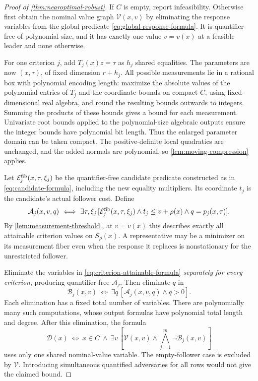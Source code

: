 \begin{proof}[Proof of \cref{thm:nearoptimal-robust}]
If $C$ is empty, report infeasibility. Otherwise first obtain the nominal value graph $\mathcal V(x,v)$ by eliminating
the response variables from the global predicate
\eqref{eq:global-response-formula}. It is quantifier-free of polynomial
size, and it has exactly one value $v=v(x)$ at a feasible leader and
none otherwise.

For one criterion $j$, add $T_j(x)z=\tau$ as $h_j$ shared equalities.
The parameters are now $(x,\tau)$, of fixed dimension $r+h_j$.
All possible measurements lie in a rational box with polynomial encoding
length: maximize the absolute values of the polynomial entries of
$T_j$ and the coordinate bounds on compact $C$, using fixed-dimensional
real algebra, and round the resulting bounds outwards to integers.
Summing the products of these bounds gives a bound for each measurement.
Univariate root bounds applied to the polynomial-size algebraic outputs
ensure the integer bounds have polynomial bit length. Thus the enlarged
parameter domain can be taken compact. The positive-definite local
quadratics are unchanged, and the added normals are polynomial, so
\cref{lem:moving-compression} applies.

Let $\mathcal E_j^{\rm fib}(x,\tau,\xi_j)$ be the quantifier-free
candidate predicate constructed as in \eqref{eq:candidate-formula},
including the new equality multipliers. Its coordinate $t_j$ is the
candidate's actual follower cost. Define
\begin{equation}\label{eq:criterion-attainable-formula}
 \mathcal A_j(x,v,q)\ \Longleftrightarrow\
 \exists\tau,\xi_j\,
 [\mathcal E_j^{\rm fib}(x,\tau,\xi_j)\wedge
       t_j\le v+\rho(x)\wedge q=p_j(x,\tau)].
\end{equation}
By \cref{lem:measurement-threshold}, at $v=v(x)$ this describes
exactly all attainable criterion values on $S_\rho(x)$. A representative
may be a minimizer on its measurement fiber even when the response it
replaces is nonstationary for the unrestricted follower.

Eliminate the variables in \eqref{eq:criterion-attainable-formula}
\emph{separately for every criterion}, producing quantifier-free
$\mathcal A_j$. Then eliminate $q$ in
\[
             \mathcal B_j(x,v)\ \Longleftrightarrow\
                 \exists q\,[\mathcal A_j(x,v,q)\wedge q>0].
\]
Each elimination has a fixed total number of variables. There are
polynomially many such computations, whose output formulas have
polynomial total length and degree. After this elimination, the formula
\begin{equation}\label{eq:robust-domain-formula}
 \mathcal D(x)\ \Longleftrightarrow\
 x\in C\ \wedge\ \exists v\,
       [\mathcal V(x,v)\wedge\bigwedge_{j=1}^m\neg\mathcal B_j(x,v)]
\end{equation}
uses only one shared nominal-value variable. The empty-follower case
is excluded by $\mathcal V$. Introducing simultaneous quantified
adversaries for all rows would not give the claimed bound.


\end{proof}
